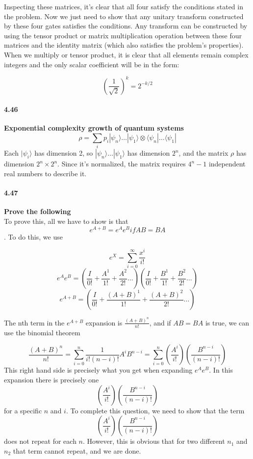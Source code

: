 Inspecting these matrices, it’s clear that all four satisfy the conditions stated in the problem. Now we just need to show that any unitary transform constructed by these four gates satisfies the conditions. Any transform can be constructed by using the tensor product or matrix multiplication operation between these four matrices and the identity matrix (which also satisfies the problem’s properties). When we multiply or tensor product, it is clear that all elements remain complex integers and the only scalar coefficient will be in the form:


$$\left( \frac{1}{\sqrt{2}}\right) ^k  = 2^{-k/2}$$

\paragraph{4.46} \textbf{Exponential complexity growth of quantum systems}
\\

$$\rho = \sum_{i} p_i |\psi_n \rangle \ldots |\psi_1 \rangle \otimes \langle \psi_n | \ldots \langle \psi_1 |$$
Each $|\psi_i \rangle$ has dimension 2, so $|\psi_n \rangle \ldots |\psi_1 \rangle$ has dimension $2^n$, and the matrix $\rho$ has dimension $2^n \times 2^n$. Since it’s normalized, the matrix requires $4^n - 1$ independent real numbers to describe it.


\paragraph{4.47} \textbf{Prove the following}
\\
To prove this, all we have to show is that $$e^{A+B} = e^Ae^B if AB = BA$$. To do this, we use


$$e^X = \sum_{i=0}^{\infty}\frac{x^i}{i!}$$
$$e^Ae^B = (\frac{I}{0!} + \frac{A^1}{1!} + \frac{A^2}{2!} \ldots)(\frac{I}{0!} + \frac{B^1}{1!} + \frac{B^2}{2!} \ldots)$$
$$e^{A+B} = (\frac{I}{0!} + \frac{(A+B)^1}{1!} + \frac{(A+B)^2}{2!} \ldots)$$


The nth term in the $e^{A+B}$ expansion is $\frac{(A+B)^n}{n!}$, and if $AB = BA$ is true, we can use the binomial theorem


$$\frac{(A+B)^n}{n!} = \sum_{i=0}^{n} \frac{1}{i!(n-i)!}A^iB^{n-i} = \sum_{i=0}^{n} \left( \frac{A^i}{i!}\right) \left( \frac{B^{n-i}}{(n-i)!}\right) $$
This right hand side is precisely what you get when expanding $e^Ae^B$. In this expansion there is precisely one $$ \left( \frac{A^i}{i!}\right) \left( \frac{B^{n-i}}{(n-i)!}\right)$$ for a specific $n$ and $i$. To complete this question, we need to show that the term $$ \left( \frac{A^i}{i!}\right) \left( \frac{B^{n-i}}{(n-i)!}\right)$$ does not repeat for each $n$. However, this is obvious that for two different $n_1$ and $n_2$ that term cannot repeat, and we are done.


